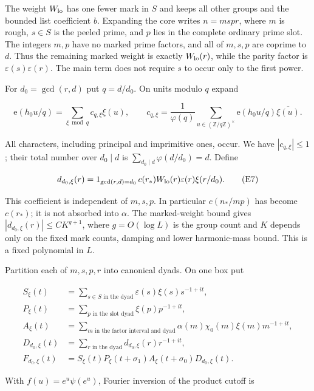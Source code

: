 The weight \(W_{\rm lo}\) has one fewer mark in \(S\) and keeps all
other groups and the bounded list coefficient \(b\). Expanding the core
writes \(n=msp r\), where \(m\) is rough, \(s\in S\) is the peeled
prime, and \(p\) lies in the complete ordinary prime slot. The integers
\(m,p\) have no marked prime factors, and all of \(m,s,p\) are coprime
to \(d\). Thus the remaining marked weight is exactly \(W_{\rm lo}(r)\),
while the parity factor is \(\varepsilon(s)\varepsilon(r)\). The main
term does not require \(s\) to occur only to the first power.

For \(d_0=\gcd(r,d)\) put \(q=d/d_0\). On units modulo \(q\) expand

\[
\mathrm e(h_0u/q)=\sum_{\xi\bmod q}c_{q,\xi}\xi(u),\qquad
c_{q,\xi}=\frac1{\varphi(q)}\sum_{u\in(\mathbb Z/q\mathbb Z)^\times}
 \mathrm e(h_0u/q)\overline{\xi(u)}.
\tag{E6}
\]

All characters, including principal and imprimitive ones, occur. We have
\(|c_{q,\xi}|\le1\); their total number over \(d_0\mid d\) is
\(\sum_{d_0\mid d}\varphi(d/d_0)=d\). Define

\[
d_{d_0,\xi}(r)=1_{\gcd(r,d)=d_0}\,
 c(r_*)W_{\rm lo}(r)\varepsilon(r)\xi(r/d_0). \tag{E7}
\]

This coefficient is independent of \(m,s,p\). In particular
\(c(n_*/mp)\) has become \(c(r_*)\); it is not absorbed into \(\alpha\).
The marked-weight bound gives \(|d_{d_0,\xi}(r)|\le C K^{g+1}\), where
\(g=O(\log L)\) is the group count and \(K\) depends only on the fixed
mark counts, damping and lower harmonic-mass bound. This is a fixed
polynomial in \(L\).

Partition each of \(m,s,p,r\) into canonical dyads. On one box put

\[
\begin{aligned}
S_\xi(t)&=\sum_{s\in S\text{ in the dyad}}
             \varepsilon(s)\xi(s)s^{-1+it},\\
P_\xi(t)&=\sum_{p\text{ in the slot dyad}}\xi(p)p^{-1+it},\\
A_\xi(t)&=\sum_{m\text{ in the factor interval and dyad}}
             \alpha(m)\chi_0(m)\xi(m)m^{-1+it},\\
D_{d_0,\xi}(t)&=\sum_{r\text{ in the dyad}}
             d_{d_0,\xi}(r)r^{-1+it},\\
F_{d_0,\xi}(t)&=S_\xi(t)P_\xi(t+\sigma_1)
                    A_\xi(t+\sigma_0)D_{d_0,\xi}(t).
\end{aligned} \tag{E8}
\]

With \(f(u)=e^u\psi(e^u)\), Fourier inversion of the product cutoff is

